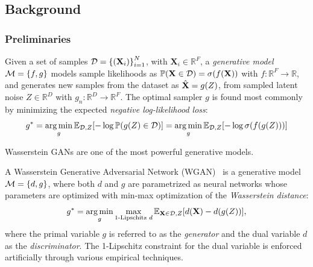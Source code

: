 \subsection{Background}
\label{sec:background_gggcrp}

\subsubsection{Preliminaries}

\begin{definition}
    Given a set of samples $\mathcal{D}=\mathopen{}\left\{\mathopen{}\left(\mathbf{X}_i\right)\right\}_{i=1}^{N}$, with $\mathbf{X}_i \in \mathbb{R}^F$, a \emph{generative model} $\mathcal{M}=\mathopen{}\left\{f,g\right\}$ models sample likelihoods as $\mathbb{P}\mathopen{}\left(\mathbf{X} \in \mathcal{D}\right)=\sigma\mathopen{}\left(f\mathopen{}\left(\mathbf{X}\right)\right)$ with $f: \mathbb{R}^F \to \mathbb{R}$, and generates new samples from the dataset as $\hat{\mathbf{X}}=g\mathopen{}\left(Z\right)$, from sampled latent noise $Z\in\mathbb{R}^D$ with $g_n:\mathbb{R}^D \to \mathbb{R}^F$. The optimal sampler $g$ is found most commonly by minimizing the expected \emph{negative log-likelihood loss}:
    \begin{equation}
        g^*=\operatorname*{arg\,min}_{g}{\mathbb{E}_{\mathcal{D},Z}\mathopen{}\left[-\log{\mathbb{P}\mathopen{}\left(g\mathopen{}\left(Z\right) \in \mathcal{D}\right)}\right]}=\operatorname*{arg\,min}_{g}{\mathbb{E}_{\mathcal{D},Z}\mathopen{}\left[-\log{\sigma\mathopen{}\left(f\mathopen{}\left(g\mathopen{}\left(Z\right)\right)\right)}\right]}
    \end{equation}
\end{definition}

Wasserstein GANs are one of the most powerful generative models.

\begin{definition}
   A Wasserstein Generative Adversarial Network (WGAN)~\cite{arjovsky_wasserstein_2017} is a generative model $\mathcal{M}=\mathopen{}\left\{d,g\right\}$, where both $d$ and $g$ are parametrized as neural networks whose parameters are optimized with min-max optimization of the \emph{Wasserstein distance}:
   \begin{equation}
   g^*=\operatorname*{arg\,min}_{g}\max_{\text{1-Lipschitz } d}{\mathbb{E}_{\mathbf{X}\in\mathcal{D},Z}\mathopen{}\left[d\mathopen{}\left(\mathbf{X}\right)-d\mathopen{}\left(g\mathopen{}\left(Z\right)\right)\right]},
    \end{equation}
   where the primal variable $g$ is referred to as the \emph{generator} and the dual variable $d$ as the \emph{discriminator}. The 1-Lipschitz constraint for the dual variable is enforced artificially through various empirical techniques.
\end{definition}

